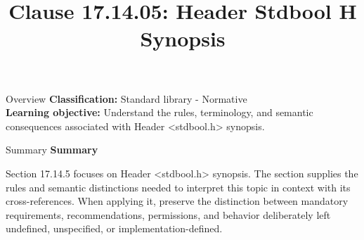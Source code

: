 \documentclass[10pt,letterpaper]{article}
\title{Clause 17.14.05: Header Stdbool H Synopsis}
\author{}
\date{}
\begin{document}
\maketitle
\begin{CornellOverviewBox}{Overview}
\textbf{Classification:} Standard library - Normative\\[2pt]
\textbf{Learning objective:} Understand the rules, terminology, and semantic consequences associated with Header <stdbool.h> synopsis.
\end{CornellOverviewBox}\begin{CornellSummaryBox}{Summary}
{\sffamily\bfseries\color{Accent} Summary}\par\vspace{3pt}Section 17.14.5 focuses on Header <stdbool.h> synopsis. The section supplies the rules and semantic distinctions needed to interpret this topic in context with its cross-references. When applying it, preserve the distinction between mandatory requirements, recommendations, permissions, and behavior deliberately left undefined, unspecified, or implementation-defined.
\end{CornellSummaryBox}
\end{document}
